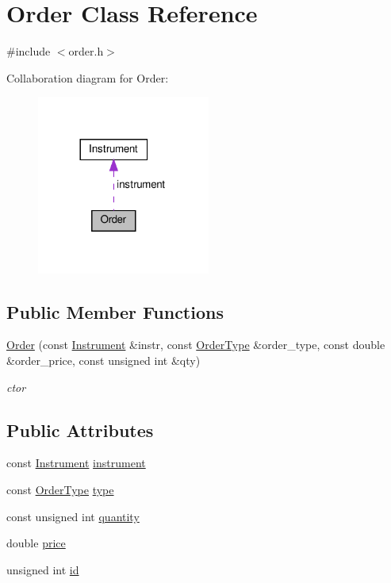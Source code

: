 \hypertarget{classOrder}{}\section{Order Class Reference}
\label{classOrder}


{\ttfamily \#include $<$order.\+h$>$}



Collaboration diagram for Order\+:\nopagebreak
\begin{figure}[H]
\begin{center}
\leavevmode
\includegraphics[width=161pt]{classOrder__coll__graph}
\end{center}
\end{figure}
\subsection*{Public Member Functions}
\begin{DoxyCompactItemize}
\item 
\hyperlink{classOrder_a936dad01587c163c6f697c5f3b6406bb}{Order} (const \hyperlink{classInstrument}{Instrument} \&instr, const \hyperlink{order_8h_a57124e387290311f33f3b54a54930418}{Order\+Type} \&order\+\_\+type, const double \&order\+\_\+price, const unsigned int \&qty)
\begin{DoxyCompactList}\small\item\em ctor \end{DoxyCompactList}\end{DoxyCompactItemize}
\subsection*{Public Attributes}
\begin{DoxyCompactItemize}
\item 
const \hyperlink{classInstrument}{Instrument} \hyperlink{classOrder_a34659d82ec58efd7a249c8412be5a8c2}{instrument}
\item 
const \hyperlink{order_8h_a57124e387290311f33f3b54a54930418}{Order\+Type} \hyperlink{classOrder_a131d51d58056d8e34b200b3661d091f2}{type}
\item 
const unsigned int \hyperlink{classOrder_a77525cd65ce276fb5dce2177de41f33f}{quantity}
\item 
double \hyperlink{classOrder_a22df57af82ecda59bd0ed1f7534a170b}{price}
\item 
unsigned int \hyperlink{classOrder_a78c189ccb42636fd4e3e88f6e9d756e4}{id}
\end{DoxyCompactItemize}


